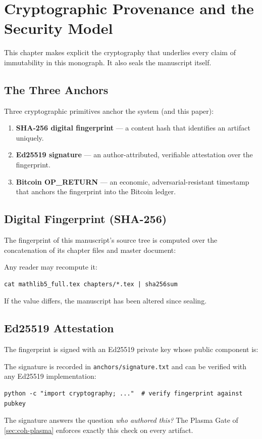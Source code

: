 \chapter{Cryptographic Provenance and the Security Model}
\label{ch:security}

This chapter makes explicit the cryptography that underlies every claim of
immutability in this monograph. It also seals the manuscript itself.

\section{The Three Anchors}
\label{sec:sec-anchors}

Three cryptographic primitives anchor the system (and this paper):
\begin{enumerate}
  \item \textbf{SHA-256 digital fingerprint} --- a content hash that
        identifies an artifact uniquely.
  \item \textbf{Ed25519 signature} --- an author-attributed, verifiable
        attestation over the fingerprint.
  \item \textbf{Bitcoin OP\_RETURN} --- an economic, adversarial-resistant
        timestamp that anchors the fingerprint into the Bitcoin ledger.
\end{enumerate}

\section{Digital Fingerprint (SHA-256)}
\label{sec:sec-sha}

The fingerprint of this manuscript's source tree is computed over the
concatenation of its chapter files and master document:
\begin{center}
\ttfamily\small 
\end{center}
Any reader may recompute it:
\begin{verbatim}
cat mathlib5_full.tex chapters/*.tex | sha256sum
\end{verbatim}
If the value differs, the manuscript has been altered since sealing.

\section{Ed25519 Attestation}
\label{sec:sec-ed}

The fingerprint is signed with an Ed25519 private key whose public component
is:
\begin{center}
\ttfamily\small 
\end{center}
The signature is recorded in \texttt{anchors/signature.txt} and can be
verified with any Ed25519 implementation:
\begin{verbatim}
python -c "import cryptography; ..."  # verify fingerprint against pubkey
\end{verbatim}
The signature answers the question \emph{who authored this?} The Plasma Gate
of \cref{sec:coh-plasma} enforces exactly this check on every artifact.

